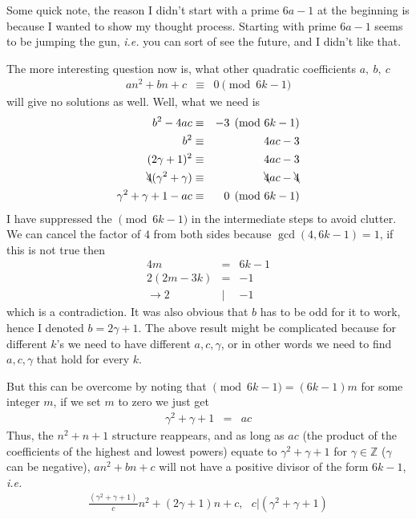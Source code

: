 \documentclass[aps,preprint,preprintnumbers,nofootinbib,showpacs,prd]{revtex4-1}
\newcommand{\ie}{{\it i.e.} }
\newcommand{\nbea}{\begin{eqnarray*}}
\newcommand{\neea}{\end{eqnarray*}}
\begin{document}
Some quick note, the reason I didn't start with a prime $6a - 1$ at the beginning is because I wanted to show my thought process. Starting with prime $6a - 1$ seems to be jumping the gun, \ie you can sort of see the future, and I didn't like that.

The more interesting question now is, what other quadratic coefficients $a,~b,~c$
%
\nbea
an^2 + bn + c & \equiv & 0 \pmod{6k - 1}
\neea
%
will give no solutions as well. Well, what we need is
%
\nbea
b^2 - 4ac & \equiv & - 3 \pmod{6k - 1} \\
b^2 & \equiv & 4ac - 3 \\
(2 \gamma + 1)^2 & \equiv & 4ac - 3 \\
\bcancel{4}(\gamma^2 + \gamma) & \equiv & \bcancel{4}ac -\bcancel{4} \\
\gamma^2 + \gamma + 1 - ac & \equiv & 0 \pmod{6k - 1}
\neea
%
I have suppressed the $\pmod{6k-1}$ in the intermediate steps to avoid clutter. We can cancel the factor of $4$ from both sides because $\gcd(4,6k-1) = 1$, if this is not true then
%
\nbea
4m & = & 6k - 1\\
2(2m - 3k) & = & -1 \\
\to 2 &|& -1
\neea
%
which is a contradiction. It was also obvious that $b$ has to be odd for it to work, hence I denoted $b = 2\gamma + 1$. The above result might be complicated because for different $k$'s we need to have different $a,c,\gamma$, or in other words we need to find $a,c,\gamma$ that hold for every $k$.

But this can be overcome by noting that $\pmod{6k-1} = (6k-1)m$ for some integer $m$, if we set $m$ to zero we just get
%
\nbea
\gamma^2 + \gamma + 1 & = & ac
\neea
%
Thus, the $n^2 + n + 1$ structure reappears, and as long as $ac$ (the product of the coefficients of the highest and lowest powers) equate to $\gamma^2 + \gamma + 1$ for $\gamma \in \mathbb{Z}$ ($\gamma$ can be negative), $an^2 + bn + c$ will not have a positive divisor of the form $6k-1$, \ie
%
\nbea
\frac{(\gamma^2 + \gamma + 1)}{c} n^2 + (2\gamma + 1)n + c, ~~~c|(\gamma^2 + \gamma + 1)
\neea
%
\end{document}
